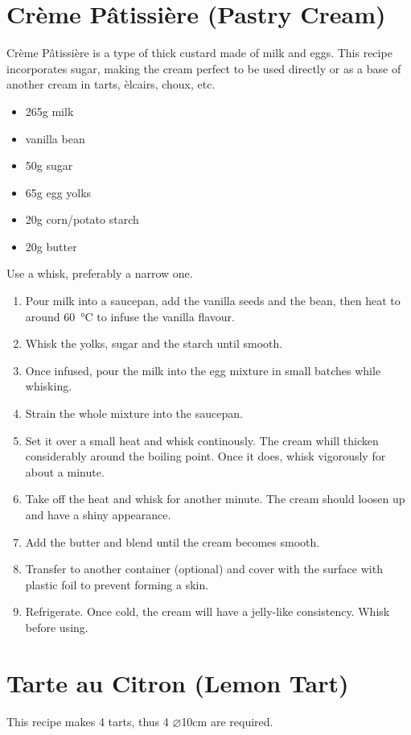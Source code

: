 \section{Crème Pâtissière (Pastry Cream)}
Crème Pâtissière is a type of thick custard made of milk and eggs. This recipe
incorporates sugar, making the cream perfect to be used directly or as a base
of another cream in tarts, èlcairs, choux, etc.

\begin{itemize}
  \item 265g milk
  \item vanilla bean
  \item 50g sugar
  \item 65g egg yolks
  \item 20g corn/potato starch
  \item 20g butter
\end{itemize}

Use a whisk, preferably a narrow one.
\begin{enumerate}
  \item Pour milk into a saucepan, add the vanilla seeds and the bean, then heat
  to around \SI{60}{\celsius} to infuse the vanilla flavour.
  \item Whisk the yolks, sugar and the starch until smooth.
  \item Once infused, pour the milk into the egg mixture in small batches while
  whisking.
  \item Strain the whole mixture into the saucepan.
  \item Set it over a small heat and whisk continously. The cream whill thicken
  considerably around the boiling point. Once it does, whisk vigorously for
  about a minute.
  \item Take off the heat and whisk for another minute. The cream should loosen
  up and have a shiny appearance.
  \item Add the butter and blend until the cream becomes smooth.
  \item Transfer to another container (optional) and cover with the surface with
  plastic foil to prevent forming a skin.
  \item Refrigerate. Once cold, the cream will have a jelly-like consistency.
  Whisk before using.
\end{enumerate}

\section{Tarte au Citron (Lemon Tart)}
This recipe makes 4 tarts, thus 4 $\diameter$10cm  are required.

